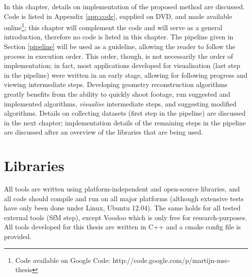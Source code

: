 
In this chapter, details on implementation of the proposed method are discussed. Code is listed in Appendix \ref{app:code}, supplied on DVD, and made available online\footnote{Code available on Google Code: http://code.google.com/p/martijn-msc-thesis}; this chapter will complement the code and will serve as a general introduction, therefore no code is listed in this chapter. The pipeline given in Section \ref{pipeline} will be used as a guideline, allowing the reader to follow the process in execution order. This order, though, is not necessarily the order of implementation; in fact, most applications developed for visualisation (last step in the pipeline) were written in an early stage, allowing for following progress and viewing intermediate steps. Developing geometry reconstruction algorithms greatly benefits from the ability to quickly shoot footage, run suggested and implemented algorithms, \emph{visualise} intermediate steps, and suggesting modified algorithms. Details on collecting datasets (first step in the pipeline) are discussed in the next chapter; implementation details of the remaining steps in the pipeline are discussed after an overview of the libraries that are being used.


\section{Libraries}  \label{libraries}
All tools are written using platform-independent and open-source libraries, and all code should compile and run on all major platforms (although extensive tests have only been done under Linux, Ubuntu 12.04). The same holds for all tested external tools (SfM step), except Voodoo which is only free for research-purposes. All tools developed for this thesis are written in C++ and a cmake config file is provided.

